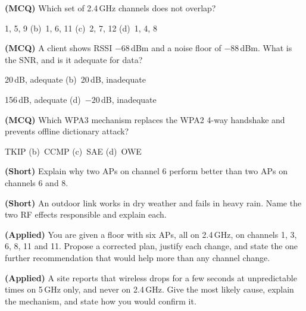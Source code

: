 \begin{reviewq}
  \item \textbf{(MCQ)} Which set of 2.4\,GHz channels does not overlap?
        \begin{tight}
          \item[(a)] 1, 5, 9 \quad (b)~1, 6, 11 \quad (c)~2, 7, 12
          \quad (d)~1, 4, 8
        \end{tight}
  \item \textbf{(MCQ)} A client shows RSSI $-68$\,dBm and a noise floor of
        $-88$\,dBm. What is the SNR, and is it adequate for data?
        \begin{tight}
          \item[(a)] 20\,dB, adequate \quad (b)~20\,dB, inadequate
          \item[(c)] 156\,dB, adequate \quad (d)~$-20$\,dB, inadequate
        \end{tight}
  \item \textbf{(MCQ)} Which WPA3 mechanism replaces the WPA2 4-way handshake and
        prevents offline dictionary attack?
        \begin{tight}
          \item[(a)] TKIP \quad (b)~CCMP \quad (c)~SAE \quad (d)~OWE
        \end{tight}
  \item \textbf{(Short)} Explain why two APs on channel 6 perform better than two
        APs on channels 6 and 8.
  \item \textbf{(Short)} An outdoor link works in dry weather and fails in heavy
        rain. Name the two RF effects responsible and explain each.
  \item \textbf{(Applied)} You are given a floor with six APs, all on 2.4\,GHz, on
        channels 1, 3, 6, 8, 11 and 11. Propose a corrected plan, justify each
        change, and state the one further recommendation that would help more
        than any channel change.
  \item \textbf{(Applied)} A site reports that wireless drops for a few seconds at
        unpredictable times on 5\,GHz only, and never on 2.4\,GHz. Give the most
        likely cause, explain the mechanism, and state how you would confirm it.
\end{reviewq}
